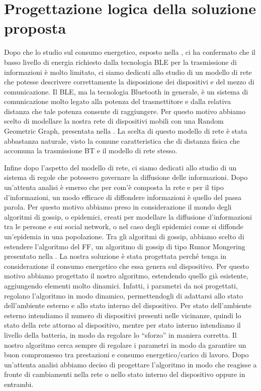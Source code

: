 \chapter{Progettazione logica della soluzione proposta}
\label{chap:Prog_log_sol}

Dopo che lo studio sul consumo energetico, esposto nella , ci ha confermato che il basso livello di energia richiesto dalla tecnologia BLE per la trasmissione di informazioni è molto limitato, ci siamo dedicati allo studio di un modello di rete che potesse descrivere correttamente la disposizione dei dispositivi e del mezzo di comunicazione. Il BLE, ma la tecnologia Bluetooth in generale, è un sistema di comunicazione molto legato alla potenza del trasmettitore e dalla relativa distanza che tale potenza consente di raggiungere. Per questo motivo abbiamo scelto di modellare la nostra rete di dispositivi mobili con una Random Geometric Graph, presentata nella . La scelta di questo modello di rete è stata abbastanza naturale, visto la comune caratteristica che di distanza fisica che accomuna la trasmissione \acs{BT} e il modello di rete stesso.

Infine dopo l'aspetto del modello di rete, ci siamo dedicati allo studio di un sistema di regole che potessero governare la diffusione delle informazioni. Dopo un'attenta analisi è emerso che per com'è composta la rete e per il tipo d'informazioni, un modo efficace di diffondere informazioni è quello del passa parola. Per questo motivo abbiamo preso in considerazione il mondo degli algoritmi di gossip, o epidemici, creati per modellare la diffusione d'informazioni tra le persone e sui social network, o nel caso degli epidemici come si diffonde un'epidemia in una popolazione. Tra gli algoritmi di gossip, abbiamo scelto di estendere l'algoritmo del \acl{FF}, un algoritmo di gossip di tipo Rumor Mongering presentato nella . La nostra soluzione è stata progettata perché tenga in considerazione il consumo energetico che essa genera sul dispositivo. Per questo motivo abbiamo progettato il nostro algoritmo, estendendo quello già esistente, aggiungendo elementi molto dinamici. Infatti, i parametri da noi progettati, regolano l'algoritmo in modo dinamico, permettendogli di adattarsi allo stato dell'ambiente esterno e allo stato interno del dispositivo. Per stato dell'ambiente esterno intendiamo il numero di dispositivi presenti nelle vicinanze, quindi lo stato della rete attorno al dispositivo, mentre per stato interno intendiamo il livello della batteria, in modo da regolare lo “sforzo” in maniera corretta. Il nostro algoritmo cerca sempre di regolare i parametri in modo da garantire un buon compromesso tra prestazioni e consumo energetico/carico di lavoro. Dopo un'attenta analisi abbiamo deciso di progettare l'algoritmo in modo che reagisse a fronte di cambiamenti nella rete o nello stato interno del dispositivo oppure in entrambi.
\bigskip

